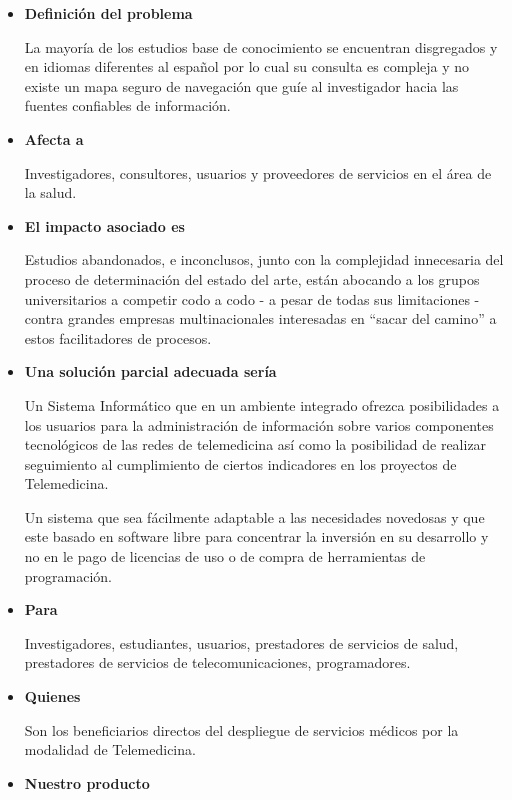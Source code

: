 \begin{itemize}
\item \textbf{Definición del problema}

La mayoría de los estudios base de conocimiento se encuentran disgregados y en idiomas diferentes al español por lo cual su consulta es compleja y no existe un mapa seguro de navegación que guíe al investigador hacia las fuentes confiables de información.

\item \textbf{Afecta a}

Investigadores, consultores, usuarios y proveedores de servicios en el área de la salud.

\item \textbf{El impacto asociado es}

Estudios abandonados, e inconclusos, junto con la complejidad innecesaria del proceso de determinación del estado del arte, están abocando a los grupos universitarios a competir codo a codo - a pesar de todas sus limitaciones - contra grandes empresas multinacionales interesadas en “sacar del camino” a estos facilitadores de procesos.

\item \textbf{Una solución parcial adecuada sería}

Un Sistema Informático que en un ambiente integrado ofrezca posibilidades a los usuarios para la administración de información sobre varios componentes tecnológicos de las redes de telemedicina así como la posibilidad de realizar seguimiento al cumplimiento de ciertos indicadores en los proyectos de Telemedicina.

Un sistema que sea fácilmente adaptable a las necesidades novedosas y que este basado en software libre para concentrar la inversión en su desarrollo y no en le pago de licencias de uso o de compra de herramientas de programación.

\item \textbf{Para}

Investigadores, estudiantes, usuarios, prestadores de servicios de salud, prestadores de servicios de telecomunicaciones, programadores.

\item \textbf{Quienes}

Son los beneficiarios directos del despliegue de servicios médicos por la modalidad de Telemedicina.

\item \textbf{Nuestro producto}


\end{itemize}
